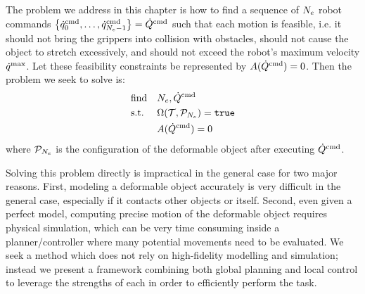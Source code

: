 The problem we address in this chapter is how to find a sequence of $N_e$ robot commands $\left\{ \dot{q}^{\textrm{cmd}}_0, \dots, \dot{q}^{\textrm{cmd}}_{N_e-1} \right\} = \dot Q^{\textrm{cmd}}$ such that each motion is feasible, i.e. it should not bring the grippers into collision with obstacles, should not cause the object to stretch excessively, and should not exceed the robot's maximum velocity $\dot{q}^\textrm{max}$. Let these feasibility constraints be represented by $A(\dot Q^{\textrm{cmd}}) = 0$. Then the problem we seek to solve is:
\begin{equation}
    \begin{aligned}
        & \text{find}   & & N_e, \dot Q^{\textrm{cmd}} \\
        & \text{s.t.}   & & \Omega(\mathcal{T}, \mathcal{P}_{N_e}) = \texttt{true}\\ 
        &               & & A(\dot Q^{\textrm{cmd}}) = 0\\
    \end{aligned}
    \label{eqn:veb_general_problem}
\end{equation}
where $\mathcal{P}_{N_e}$ is the configuration of the deformable object after executing $\dot Q^{\textrm{cmd}}$.

Solving this problem directly is impractical in the general case for two major reasons. First, modeling a deformable object accurately is very difficult in the general case, especially if it contacts other objects or itself. Second, even given a perfect model, computing precise motion of the deformable object requires physical simulation, which can be very time consuming inside a planner/controller where many potential movements need to be evaluated. We seek a method which does not rely on high-fidelity modelling and simulation; instead we present a framework combining both global planning and local control to leverage the strengths of each in order to efficiently perform the task.
